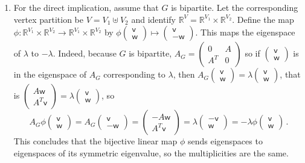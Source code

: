 \documentclass[kulak]{tplt}
\theoremstyle{definition}
\newcommand{\R}{\mathbb{R}}
\newcommand{\vv}{\mathsf{v}}
\newcommand{\vw}{\mathsf{w}}
\begin{document}
\begin{enumerate}
\begin{enumerate}
\item 
For the direct implication, assume that $G$ is bipartite.
Let the corresponding vertex partition be $V = V_1 \uplus V_2$ and identify $\R^V = \R^{V_1} \times \R^{V_2}$.
Define the map $\phi : \R^{V_1} \times \R^{V_2} \to \R^{V_1} \times \R^{V_2}$ by $\phi \begin{pmatrix}\vv \\  \vw \end{pmatrix}  \mapsto  \begin{pmatrix}\vv \\  -\vw \end{pmatrix} $.
This maps the eigenspace of $\lambda $ to $-\lambda$.
Indeed, because $G$ is bipartite, $A_G = \begin{pmatrix}
0 & A\\
A^T & 0
\end{pmatrix}$ so if $\begin{pmatrix}\vv \\  \vw \end{pmatrix}$ is in the eigenspace of $A_G$ corresponding to $\lambda$, then $A_G \begin{pmatrix}\vv \\  \vw \end{pmatrix} = \lambda \begin{pmatrix}\vv \\  \vw \end{pmatrix}$, that is $ \begin{pmatrix}A\vw \\  A^T\vv \end{pmatrix}  = \lambda  \begin{pmatrix}\vv \\  \vw \end{pmatrix} $, so 
$$A_G \phi  \begin{pmatrix}\vv \\  \vw \end{pmatrix} = A_G  \begin{pmatrix}\vv \\  -\vw \end{pmatrix}  =  \begin{pmatrix}-A\vw \\  A^T\vv \end{pmatrix}  = \lambda  \begin{pmatrix}-\vv \\  \vw \end{pmatrix}   = -\lambda \phi \begin{pmatrix}\vv \\  \vw \end{pmatrix} \, . $$
This concludes that the bijective linear map $\phi$ sends eigenspaces to eigenspaces of its symmetric eigenvalue, so the multiplicities are the same.


\end{enumerate}
\end{enumerate}
\end{document}
